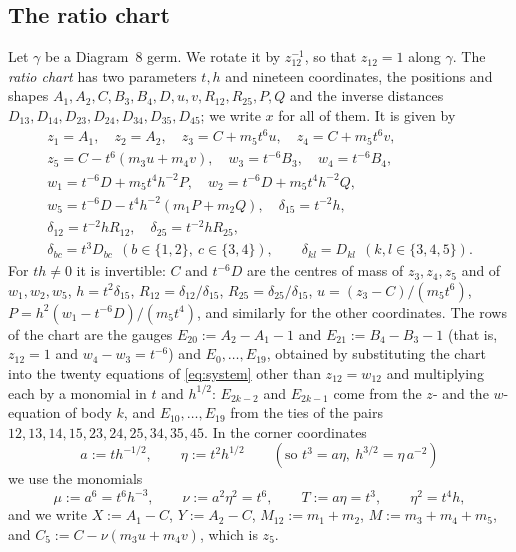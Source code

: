 \subsection{The ratio chart}
Let $\gamma$ be a Diagram~8 germ.  We rotate it by $z_{12}^{-1}$, so that $z_{12}=1$ along
$\gamma$.  The \emph{ratio chart} has two parameters $t,h$ and nineteen coordinates, the
positions and shapes $A_1,A_2,C,B_3,B_4,D,u,v,R_{12},R_{25},P,Q$ and the inverse distances
$D_{13},D_{14},D_{23},D_{24},D_{34},D_{35},D_{45}$; we write $x$ for all of them.  It is given by
\begin{gather*}
  z_1=A_1,\quad z_2=A_2,\quad z_3=C+m_5t^6u,\quad z_4=C+m_5t^6v,\\
  z_5=C-t^6(m_3u+m_4v),\quad w_3=t^{-6}B_3,\quad w_4=t^{-6}B_4,\\
  w_1=t^{-6}D+m_5t^4h^{-2}P,\quad w_2=t^{-6}D+m_5t^4h^{-2}Q,\\
  w_5=t^{-6}D-t^4h^{-2}(m_1P+m_2Q),\quad \delta_{15}=t^{-2}h,\\
  \delta_{12}=t^{-2}hR_{12},\quad \delta_{25}=t^{-2}hR_{25},\\
  \delta_{bc}=t^3D_{bc}\ \ (b\in\{1,2\},\ c\in\{3,4\}),\qquad
  \delta_{kl}=D_{kl}\ \ (k,l\in\{3,4,5\}).
\end{gather*}
For $th\ne0$ it is invertible: $C$ and $t^{-6}D$ are the centres of mass of $z_3,z_4,z_5$ and of
$w_1,w_2,w_5$, $h=t^2\delta_{15}$, $R_{12}=\delta_{12}/\delta_{15}$,
$R_{25}=\delta_{25}/\delta_{15}$, $u=(z_3-C)/(m_5t^6)$, $P=h^2(w_1-t^{-6}D)/(m_5t^4)$, and
similarly for the other coordinates.
The rows of the chart are the gauges $E_{20}:=A_2-A_1-1$ and $E_{21}:=B_4-B_3-1$ (that is,
$z_{12}=1$ and $w_4-w_3=t^{-6}$) and $E_0,\dots,E_{19}$, obtained by substituting the chart into
the twenty equations of \eqref{eq:system} other than $z_{12}=w_{12}$ and multiplying each by a
monomial in $t$ and $h^{1/2}$: $E_{2k-2}$ and $E_{2k-1}$ come from the $z$- and the $w$-equation
of body $k$, and $E_{10},\dots,E_{19}$ from the ties of the pairs
$12,13,14,15,23,24,25,34,35,45$.
In the corner coordinates
\[
  a:=th^{-1/2},\qquad \eta:=t^2h^{1/2}\qquad(\text{so } t^3=a\eta,\ h^{3/2}=\eta\,a^{-2})
\]
we use the monomials
\[
  \mu:=a^6=t^6h^{-3},\qquad \nu:=a^2\eta^2=t^6,\qquad T:=a\eta=t^3,\qquad \eta^2=t^4h,
\]
and we write $X:=A_1-C$, $Y:=A_2-C$, $M_{12}:=m_1+m_2$, $M:=m_3+m_4+m_5$, and
$C_5:=C-\nu(m_3u+m_4v)$, which is $z_5$.


